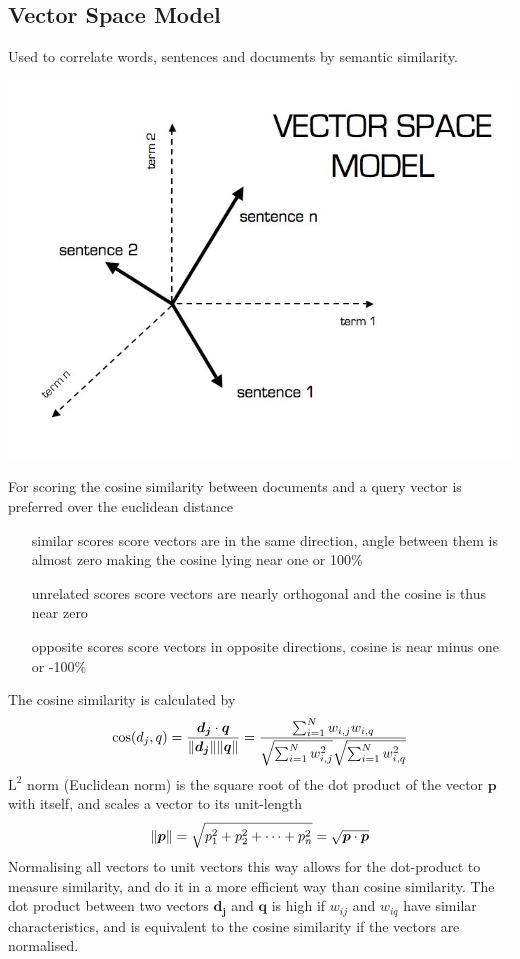 \documentclass[11pt]{article}
\DeclarePairedDelimiter\norm{\lVert}{\rVert}
\begin{document}
\subsection{Vector Space Model}
Used to correlate words, sentences and documents by semantic similarity.
\begin{center}
	\includegraphics[width=0.5\linewidth]{img/vector_space_model}
\end{center}
For scoring the cosine similarity between documents and a query vector is preferred over the euclidean distance
\begin{itemize}[leftmargin=*, labelindent=3cm, labelsep=1cm, noitemsep]
	\item[similar scores] score vectors are in the same direction, angle between them is almost zero making the cosine lying near one or 100\%
	\item[unrelated scores] score vectors are nearly orthogonal and the cosine is thus near zero
	\item[opposite scores] score vectors in opposite directions, cosine is near minus one or -100\%
\end{itemize}         
The cosine similarity is calculated by
\begin{equation*}
	\cos(d_j,q) = \frac{\bm{d_j}\cdot \bm{q}}{\norm{\bm{d_j}}\norm{\bm{q}}} = \frac{\sum_{i=1}^{N} w_{i,j} w_{i,q} }{\sqrt{\sum_{i=1}^{N}w_{i,j}^2}\sqrt{\sum_{i=1}^{N}w_{i,q}^2}}
\end{equation*}
$\text{L}^2$ norm (Euclidean norm) is the square root of the dot product of the vector $\bm{p}$ with itself, and scales a vector to its unit-length
\begin{equation*}
	\norm{\bm{p}} = \sqrt{p_1^2 + p_2^2 + \dots + p_n^2} = \sqrt{\bm{p}\cdot\bm{p}}
\end{equation*}
Normalising all vectors to unit vectors this way allows for the dot-product to measure similarity, and do it in a more efficient way than cosine similarity. The dot product between two vectors $\bm{d_j}$ and $\bm{q}$ is high if $w_{ij}$ and $w_{iq}$ have similar characteristics, and is equivalent to the cosine similarity if the vectors are normalised.
\end{document}
